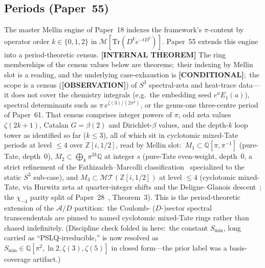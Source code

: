 \documentclass[aps,pra,twocolumn,superscriptaddress,longbibliography]{revtex4-2}
\newcommand{\gvc}[2]{#2}
\begin{document}
\subsection{Periods (Paper~55)}
The master Mellin engine of Paper~18 indexes the framework's
$\pi$-content by operator order $k \in \{0, 1, 2\}$ in
$\mathcal{M}[\mathrm{Tr}(D^k e^{-t D^2})]$.  Paper~55 extends this
engine into a period-theoretic census.  \textbf{[INTERNAL THEOREM]}
The ring memberships of the census values below are theorems;\ their
indexing by Mellin slot is a reading, and \gvc{pi-source-case-exhaustion}{the underlying case-exhaustion
is \textbf{[CONDITIONAL]}};\ the scope is a census
(\textbf{[OBSERVATION]}) of $S^3$ spectral-zeta and heat-trace
data---it does not cover the chemistry integrals (e.g.\ the embedding
seed $e^a E_1(a)$), spectral determinants such as
$\pi\,e^{\zeta(3)/(2\pi^2)}$, or the genus-one three-centre period of
Paper~61.  That census comprises
integer powers of $\pi$,
odd zeta values $\zeta(2k{+}1)$, Catalan $G = \beta(2)$ and
Dirichlet-$\beta$ values, and the depth-$k$ loop tower as identified so
far ($k \le 3$), all of which sit in
cyclotomic mixed-Tate periods at level $\le 4$ over $\mathbb{Z}[i, 1/2]$,
read by Mellin slot:\ $M_1 \subset \mathbb{Q}[\pi, \pi^{-1}]$
(pure-Tate, depth~0), \gvc{m2-ring-integer-s}{$M_2 \subset \bigoplus_k \pi^{2k}\mathbb{Q}$ at integer $s$}
(pure-Tate even-weight, depth~0, a strict refinement of the
Fathizadeh--Marcolli classification~\cite{fathizadeh_marcolli2016}
specialized to the static $S^3$ sub-case), and $M_3 \subset \mathcal{MT}(\mathbb{Z}[i, 1/2])$ at level
$\le 4$ (cyclotomic mixed-Tate, via Hurwitz zeta at quarter-integer
shifts and the Deligne--Glanois descent~\cite{glanois2015}; the $\chi_{-4}$
parity split of Paper~28~\cite{loutey_paper28}, Theorem~3).  This is the period-theoretic extension of
the $\mathcal{A}/D$ partition:\ the Coulomb- ($D$-)sector spectral
transcendentals are pinned to named cyclotomic mixed-Tate rings rather than chased
indefinitely.  (Discipline check folded in here:\ the constant
$S_{\min}$, long carried as ``PSLQ-irreducible,'' is now resolved as
$S_{\min} \in \mathbb{Q}[\pi^2, \ln 2, \zeta(3), \zeta(5)]$ in closed
form---the prior label was a basis-coverage artifact.)
\end{document}

